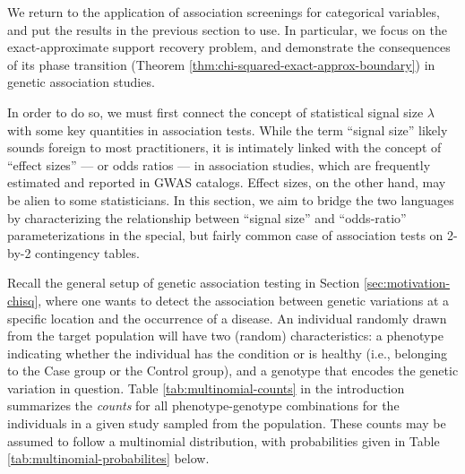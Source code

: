 
We return to the application of association screenings for categorical variables, and put the results in the previous section to use.
In particular, we focus on the exact-approximate support recovery problem, and demonstrate the consequences of its phase transition (Theorem \ref{thm:chi-squared-exact-approx-boundary}) in genetic association studies.

In order to do so, we must first connect the concept of statistical signal size $\lambda$ with some key quantities in association tests.
While the term ``signal size'' likely sounds foreign to most practitioners, it is intimately linked with the concept of ``effect sizes'' --- or odds ratios --- in association studies, which are frequently estimated and reported in GWAS catalogs. 
Effect sizes, on the other hand, may be alien to some statisticians.  
In this section, we aim to bridge the two languages by characterizing the relationship between ``signal size'' and ``odds-ratio'' parameterizations in the special, but fairly common case of association tests on 2-by-2 contingency tables.



Recall the general setup of genetic association testing in Section \ref{sec:motivation-chisq}, where one wants to detect the association between genetic variations at a specific location and the occurrence of a disease. 
An individual randomly drawn from the target population will have two (random) characteristics: a phenotype indicating whether the individual has the condition or is healthy (i.e., belonging to the Case group or the Control group), and a genotype that encodes the genetic variation in question. 
Table \ref{tab:multinomial-counts} in the introduction summarizes the {\em counts} for all phenotype-genotype combinations for the individuals in a given study sampled from the population.
These counts may be assumed to follow a multinomial distribution, with probabilities given in Table \ref{tab:multinomial-probabilites} below. 

